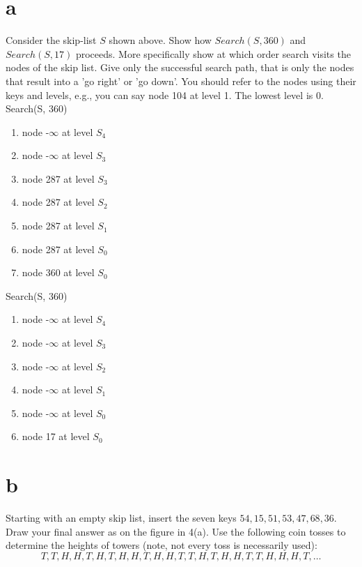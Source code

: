 \documentclass[12pt]{article}
\begin{document}
\begin{enumerate}
\part{a} Consider the skip-list $S$ shown above. Show how $Search(S, 360)$
and  $Search(S, 17)$ proceeds.
More specifically show at which order search visits the nodes of the skip list.
Give only the successful search path, that is only the nodes that result into a 'go right' or 'go down'.
You should refer to the nodes using their keys and levels, e.g.,
you can say node 104 at level 1. The lowest level is $0$.\\
Search(S, 360)
\begin{enumerate}
  \item node -$\infty$ at level $S_4$
  \item node -$\infty$ at level $S_3$
  \item node 287 at level $S_3$
  \item node 287 at level $S_2$
  \item node 287 at level $S_1$
  \item node 287 at level $S_0$
  \item node 360 at level $S_0$
\end{enumerate}
Search(S, 360)
\begin{enumerate}
  \item node -$\infty$ at level $S_4$
  \item node -$\infty$ at level $S_3$
  \item node -$\infty$ at level $S_2$
  \item node -$\infty$ at level $S_1$
  \item node -$\infty$ at level $S_0$
  \item node 17 at level $S_0$
\end{enumerate}

\part{b} Starting with an empty skip list, insert the seven keys
      $54, 15, 51,53, 47,68,36$.
      Draw your final answer as on the figure in 4(a).
      Use the following coin
      tosses to determine the  heights of towers (note, not every
      toss is necessarily used):
     $$T,T,H,H,T,H,T,H,H,T,H,H,T,T,H,T,H,H,T,T,H,H,H,T,\ldots$$


\end{enumerate}
\end{document}
